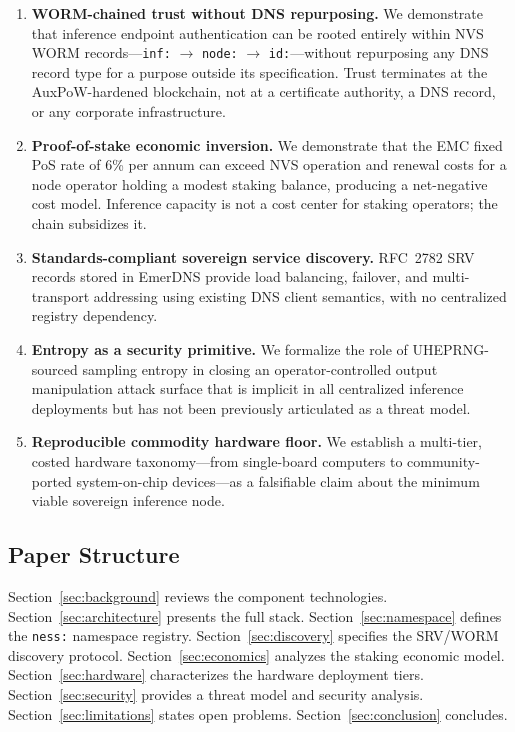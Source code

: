 \documentclass[11pt,a4paper]{article}
\theoremstyle{definition}
\begin{document}
\begin{enumerate}[leftmargin=*, label=\textbf{C\arabic*.}]
  \item \textbf{WORM-chained trust without DNS repurposing.}  We demonstrate
    that inference endpoint authentication can be rooted entirely within NVS
    WORM records---\texttt{inf:} $\to$ \texttt{node:} $\to$ \texttt{id:}---without
    repurposing any DNS record type for a purpose outside its specification.
    Trust terminates at the AuxPoW-hardened blockchain, not at a certificate
    authority, a DNS record, or any corporate infrastructure.

  \item \textbf{Proof-of-stake economic inversion.}  We demonstrate that the
    EMC fixed PoS rate of 6\% per annum can exceed NVS operation and renewal
    costs for a node operator holding a modest staking balance, producing a
    net-negative cost model.  Inference capacity is not a cost center for
    staking operators; the chain subsidizes it.

  \item \textbf{Standards-compliant sovereign service discovery.}  RFC~2782 SRV
    records stored in EmerDNS provide load balancing, failover, and multi-transport
    addressing using existing DNS client semantics, with no centralized registry
    dependency.

  \item \textbf{Entropy as a security primitive.}  We formalize the role of
    UHEPRNG-sourced sampling entropy in closing an operator-controlled output
    manipulation attack surface that is implicit in all centralized inference
    deployments but has not been previously articulated as a threat model.

  \item \textbf{Reproducible commodity hardware floor.}  We establish a
    multi-tier, costed hardware taxonomy---from single-board computers to
    community-ported system-on-chip devices---as a falsifiable claim about the
    minimum viable sovereign inference node.
\end{enumerate}

\subsection{Paper Structure}

Section~\ref{sec:background} reviews the component technologies.
Section~\ref{sec:architecture} presents the full stack.
Section~\ref{sec:namespace} defines the \texttt{ness:} namespace registry.
Section~\ref{sec:discovery} specifies the SRV/WORM discovery protocol.
Section~\ref{sec:economics} analyzes the staking economic model.
Section~\ref{sec:hardware} characterizes the hardware deployment tiers.
Section~\ref{sec:security} provides a threat model and security analysis.
Section~\ref{sec:limitations} states open problems.
Section~\ref{sec:conclusion} concludes.
\end{document}
